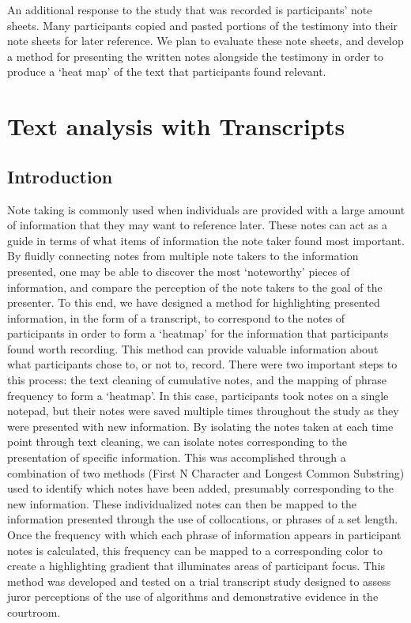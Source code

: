 \documentclass[print]{nuthesis}
\begin{document}
An additional response to the study that was recorded is participants' note sheets.
Many participants copied and pasted portions of the testimony into their note sheets for later reference.
We plan to evaluate these note sheets, and develop a method for presenting the written notes alongside the testimony in order to produce a `heat map' of the text that participants found relevant.

\hypertarget{textcolor}{%
\chapter{Text analysis with Transcripts}\label{textcolor}}

\hypertarget{introduction-1}{%
\section{Introduction}\label{introduction-1}}

Note taking is commonly used when individuals are provided with a large amount of information that they may want to reference later.
These notes can act as a guide in terms of what items of information the note taker found most important.
By fluidly connecting notes from multiple note takers to the information presented, one may be able to discover the most `noteworthy' pieces of information, and compare the perception of the note takers to the goal of the presenter.
To this end, we have designed a method for highlighting presented information, in the form of a transcript, to correspond to the notes of participants in order to form a `heatmap' for the information that participants found worth recording. This method can provide valuable information about what participants chose to, or not to, record.
There were two important steps to this process: the text cleaning of cumulative notes, and the mapping of phrase frequency to form a `heatmap'.
In this case, participants took notes on a single notepad, but their notes were saved multiple times throughout the study as they were presented with new information.
By isolating the notes taken at each time point through text cleaning, we can isolate notes corresponding to the presentation of specific information.
This was accomplished through a combination of two methods (First N Character and Longest Common Substring) used to identify which notes have been added, presumably corresponding to the new information.
These individualized notes can then be mapped to the information presented through the use of collocations, or phrases of a set length.
Once the frequency with which each phrase of information appears in participant notes is calculated, this frequency can be mapped to a corresponding color to create a highlighting gradient that illuminates areas of participant focus.
This method was developed and tested on a trial transcript study designed to assess juror perceptions of the use of algorithms and demonstrative evidence in the courtroom.
\end{document}
